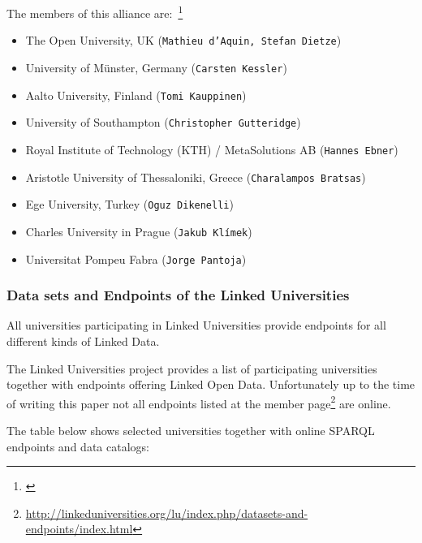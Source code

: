 The members of this alliance are:~\footnote{\citet{url:linked-universities-members}}
\begin{itemize}
	\item The Open University, UK (\texttt{Mathieu d'Aquin, Stefan Dietze})
	\item University of M\"unster, Germany (\texttt{Carsten Kessler})
	\item Aalto University, Finland (\texttt{Tomi Kauppinen})
	\item University of Southampton (\texttt{Christopher Gutteridge})
	\item Royal Institute of Technology (KTH) / MetaSolutions AB (\texttt{Hannes Ebner})
	\item Aristotle University of Thessaloniki, Greece (\texttt{Charalampos Bratsas})
	\item Ege University, Turkey (\texttt{Oguz Dikenelli})
	\item Charles University in Prague (\texttt{Jakub Klímek})
	\item Universitat Pompeu Fabra (\texttt{Jorge Pantoja})
\end{itemize}

\subsubsection{Data sets and Endpoints of the Linked Universities}
All universities participating in Linked Universities provide endpoints for all different kinds of Linked Data.

The Linked Universities project provides a list of participating universities together with endpoints offering Linked Open Data. 
Unfortunately up to the time of writing this paper not all endpoints listed at the member page\footnote{\label{LOD_endpoints}\url{http://linkeduniversities.org/lu/index.php/datasets-and-endpoints/index.html}} are online. 

The table below shows selected universities together with online SPARQL endpoints and data catalogs: 

